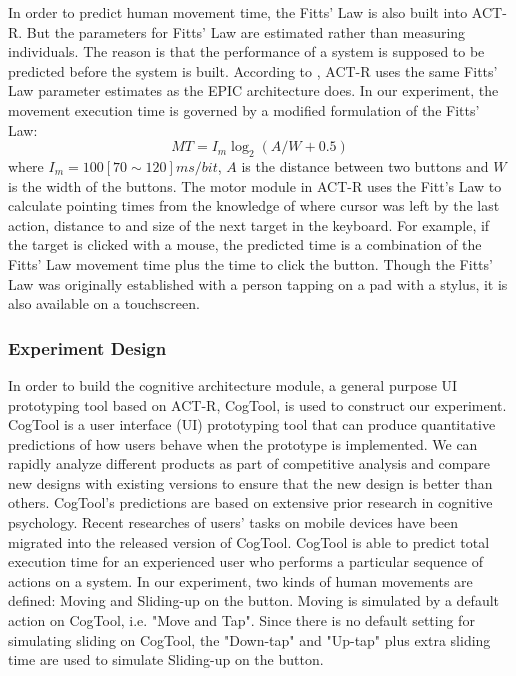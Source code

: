 \documentclass{singlecol-new}
\theoremstyle{TH}{
\newtheorem{lemma}{Lemma}
\newtheorem{theorem}[lemma]{Theorem}
\newtheorem{corrolary}[lemma]{Corrolary}
\newtheorem{conjecture}[lemma]{Conjecture}
\newtheorem{proposition}[lemma]{Proposition}
\newtheorem{claim}[lemma]{Claim}
\newtheorem{stheorem}[lemma]{Wrong Theorem}
\newtheorem{algorithm}{Algorithm}
}
\theoremstyle{THrm}{
\newtheorem{definition}{Definition}[section]
\newtheorem{question}{Question}[section]
\newtheorem{remark}{Remark}
\newtheorem{scheme}{Scheme}
}
\theoremstyle{THhit}{
\newtheorem{case}{Case}[section]
}
\begin{document}
In order to predict human movement time, the Fitts' Law is also built into ACT-R. But the parameters for Fitts' Law are estimated rather than measuring individuals. The reason is that the performance of a system is supposed to be predicted before the system is built. According to \citet{byrne2001act}, ACT-R uses the same Fitts' Law parameter estimates as the EPIC architecture does. In our experiment, the movement execution time is governed by a modified formulation of the Fitts' Law:
\begin{equation}
  MT=I_m \log_2(A/W+0.5)
\end{equation}
where $I_m=100[70\sim120]ms/bit$, $A$ is the distance between two buttons and $W$ is the width of the buttons. The motor module in ACT-R uses the Fitt's Law to calculate pointing times from the knowledge of where cursor was left by the last action, distance to and size of the next target in the keyboard. For example, if the target is clicked with a mouse, the predicted time is a combination of the Fitts' Law movement time plus the time to click the button. Though the Fitts' Law was originally established with a person tapping on a pad with a stylus, it is also available on a touchscreen. \\

\subsubsection{Experiment Design}

In order to build the cognitive architecture module, a general purpose UI prototyping tool based on ACT-R, CogTool, is used to construct our experiment. CogTool is a user interface (UI) prototyping tool that can produce quantitative predictions of how users behave when the prototype is implemented. We can rapidly analyze different products as part of competitive analysis and compare new designs with existing versions to ensure that the new design is better than others. CogTool's predictions are based on extensive prior research in cognitive psychology. Recent researches of users' tasks on mobile devices have been migrated into the released version of CogTool. CogTool is able to predict total execution time for an experienced user who performs a particular sequence of actions on a system. In our experiment, two kinds of human movements are defined: Moving and Sliding-up on the button. Moving is simulated by a default action on CogTool, i.e. "Move and Tap". Since there is no default setting for simulating sliding on CogTool, the "Down-tap" and "Up-tap" plus extra sliding time are used to simulate Sliding-up on the button. \\
\end{document}
